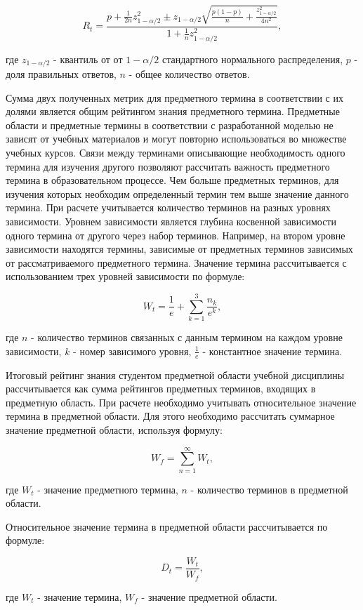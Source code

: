 $$
    R_t = \frac{p+\frac{1}{2n}z_{1-\alpha/2}^2 \pm z_{1-\alpha/2}\sqrt{\frac{p(1-p)}{n}+\frac{z_{1-\alpha/2}^2}{4n^2}}{} }{1+\frac{1}{n}z_{1-\alpha/2}^2},
$$

где \(z_{1-\alpha/2}\) - квантиль от от \(1-\alpha/2\) стандартного нормального распределения, \(p\) - доля правильных ответов, \(n\) - общее количество ответов. 

Сумма двух полученных метрик для предметного термина в соответствии с их долями является общим рейтингом знания предметного термина. Предметные области и предметные термины в соответствии с разработанной моделью не зависят от учебных материалов и могут повторно использоваться во множестве учебных курсов. Связи между терминами описывающие необходимость одного термина для изучения другого позволяют рассчитать важность предметного термина в образовательном процессе. Чем больше предметных терминов, для изучения которых необходим определенный термин тем выше значение данного термина. При расчете учитывается количество терминов на разных уровнях зависимости. Уровнем зависимости является глубина косвенной зависимости одного термина от другого через набор терминов. Например, на втором уровне зависимости находятся термины, зависимые от предметных терминов зависимых от рассматриваемого предметного термина. Значение термина рассчитывается с использованием трех уровней зависимости по формуле: 

$$
    W_t = \frac{1}{e}+\sum_{k=1}^{3}\frac{n_k}{e^k}, 
$$

где \(n\) - количество терминов связанных с данным термином на каждом уровне зависимости, \(k\) - номер зависимого уровня, \( \frac{1}{e} \) - константное значение термина. 

Итоговый рейтинг знания студентом предметной области учебной дисциплины рассчитывается как сумма рейтингов предметных терминов, входящих в предметную область. При расчете необходимо учитывать относительное значение термина в предметной области. Для этого необходимо рассчитать суммарное значение предметной области, используя формулу:

$$  
    W_f = \sum_{n=1}^{\infty}W_t,
$$

где \(W_t\) - значение предметного термина, \(n\) - количество терминов в предметной области.

Относительное значение термина в предметной области рассчитывается по формуле:

$$
    D_t = \frac{W_t}{W_f},
$$

где \(W_t\) - значение термина, \(W_f\) - значение предметной области.

